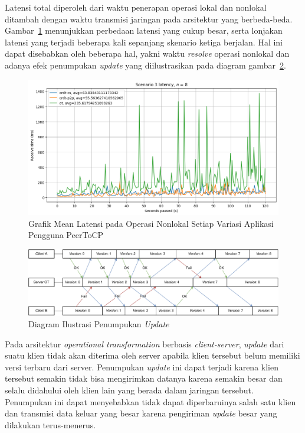 Latensi total diperoleh dari waktu penerapan operasi lokal dan nonlokal ditambah dengan waktu transmisi jaringan pada arsitektur yang berbeda-beda. Gambar~\ref{fig:7-5} menunjukkan perbedaan latensi yang cukup besar, serta lonjakan latensi yang terjadi beberapa kali sepanjang skenario ketiga berjalan. Hal ini dapat disebabkan oleh beberapa hal, yakni waktu \textit{resolve} operasi nonlokal dan adanya efek penumpukan \textit{update} yang diilustrasikan pada diagram gambar~\ref{diagram:snowball}.

\begin{figure}
 \centering
 \includegraphics[width=15cm]{./assets/skripsi/benchmark-vis_cell_7_output_5}
 \caption{Grafik Mean Latensi pada Operasi Nonlokal Setiap Variasi Aplikasi Pengguna PeerToCP}
 \label{fig:7-5}
\end{figure}

\begin{figure}
 \centering
 \includegraphics[width=15cm]{./assets/skripsi/Snowball}
 \caption{Diagram Ilustrasi Penumpukan \textit{Update}}
 \label{diagram:snowball}
\end{figure}

Pada arsitektur \textit{operational transformation} berbasis \textit{client-server}, \textit{update} dari suatu klien tidak akan diterima oleh server apabila klien tersebut belum memiliki versi terbaru dari server. Penumpukan \textit{update} ini dapat terjadi karena klien tersebut semakin tidak bisa mengirimkan datanya karena semakin besar dan selalu didahului oleh klien lain yang berada dalam jaringan tersebut. Penumpukan ini dapat menyebabkan tidak dapat diperbaruinya salah satu klien dan transmisi data keluar yang besar karena pengiriman \textit{update} besar yang dilakukan terus-menerus.

